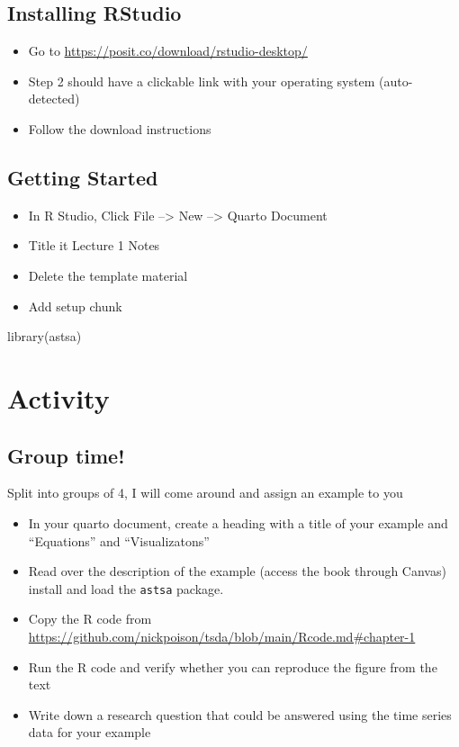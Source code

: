 \documentclass[
  letterpaper,
  DIV=11,
  numbers=noendperiod]{scrreprt}
\newenvironment{Shaded}{\begin{snugshade}}{\end{snugshade}}
\newcommand{\FunctionTok}[1]{\textcolor[rgb]{0.28,0.35,0.67}{#1}}
\newcommand{\NormalTok}[1]{\textcolor[rgb]{0.00,0.23,0.31}{#1}}
\begin{document}
\section{Installing RStudio}\label{installing-rstudio}

\begin{itemize}
\item
  Go to \url{https://posit.co/download/rstudio-desktop/}
\item
  Step 2 should have a clickable link with your operating system
  (auto-detected)
\item
  Follow the download instructions
\end{itemize}

\section{Getting Started}\label{getting-started}

\begin{itemize}
\item
  In R Studio, Click File --\textgreater{} New --\textgreater{} Quarto
  Document
\item
  Title it Lecture 1 Notes
\item
  Delete the template material
\item
  Add setup chunk
\end{itemize}

\begin{Shaded}
\begin{Highlighting}[]
\FunctionTok{library}\NormalTok{(astsa)}
\end{Highlighting}
\end{Shaded}

\chapter{Activity}\label{activity}

\section{Group time!}\label{group-time}

Split into groups of 4, I will come around and assign an example to you

\begin{itemize}
\item
  In your quarto document, create a heading with a title of your example
  and ``Equations'' and ``Visualizatons''
\item
  Read over the description of the example (access the book through
  Canvas)\\
  install and load the \texttt{astsa} package.
\item
  Copy the R code from
  \url{https://github.com/nickpoison/tsda/blob/main/Rcode.md\#chapter-1}
\item
  Run the R code and verify whether you can reproduce the figure from
  the text
\item
  Write down a research question that could be answered using the time
  series data for your example
\end{itemize}
\end{document}
